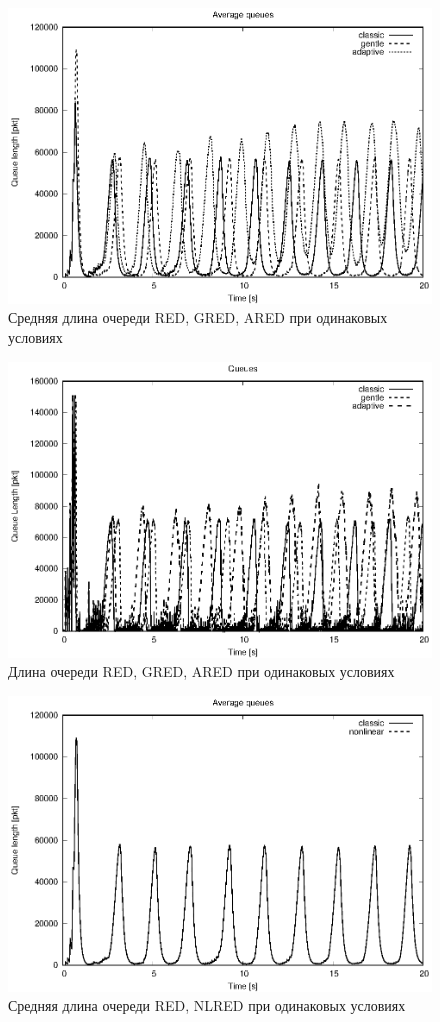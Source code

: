 \begin{figure}[!h]
  \centering
  \includegraphics[width=0.6\linewidth]{image/av_queues_3types.eps}
  \caption{Средняя длина очереди RED, GRED, ARED при одинаковых условиях}
  \label{fig:3.4}
\end{figure}

\begin{figure}[!ht]
  \centering
  \includegraphics[width=0.6\linewidth]{image/queues_3types.eps}
  \caption{Длина очереди RED, GRED, ARED при одинаковых условиях}
  \label{fig:3.5}
\end{figure}

\begin{figure}[!ht]
  \centering
  \includegraphics[width=0.6\linewidth]{image/av_queues_classic_nonlinear.eps}
  \caption{Средняя длина очереди RED, NLRED при одинаковых условиях}
  \label{fig:3.6}
\end{figure}

